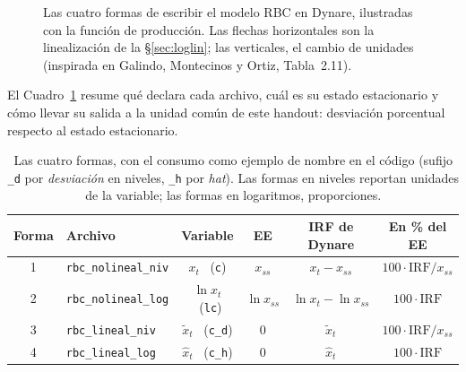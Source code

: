 \documentclass[11pt,a4paper]{report}
\newcommand{\code}[1]{\texttt{#1}}
\begin{document}
\begin{figure}[H]
\caption{Las cuatro formas de escribir el modelo RBC en Dynare, ilustradas con la
función de producción. Las flechas horizontales son la linealización de la
\S\ref{sec:loglin}; las verticales, el cambio de unidades (inspirada en Galindo,
Montecinos y Ortiz, Tabla~2.11).}
\label{fig:cuatroformas}
\end{figure}

\noindent El Cuadro~\ref{tab:cuatroformas} resume qué declara cada archivo, cuál es
su estado estacionario y cómo llevar su salida a la unidad común de este handout:
desviación porcentual respecto al estado estacionario.

\begin{table}[H]
\centering\small
\setlength{\tabcolsep}{4pt}
\begin{tabular}{clcccc}
\toprule
\textbf{Forma} & \textbf{Archivo} & \textbf{Variable} & \textbf{EE} & \textbf{IRF de Dynare} & \textbf{En \% del EE}\\
\midrule
1 & \code{rbc\_nolineal\_niv} & $x_t$ \ (\code{c})        & $x_{ss}$     & $x_t-x_{ss}$ & $100\cdot\mathrm{IRF}/x_{ss}$\\
2 & \code{rbc\_nolineal\_log} & $\ln x_t$ \ (\code{lc})   & $\ln x_{ss}$ & $\ln x_t-\ln x_{ss}$ & $100\cdot\mathrm{IRF}$\\
3 & \code{rbc\_lineal\_niv}   & $\tilde{x}_t$ \ (\code{c\_d}) & $0$      & $\tilde{x}_t$ & $100\cdot\mathrm{IRF}/x_{ss}$\\
4 & \code{rbc\_lineal\_log}   & $\hat{x}_t$ \ (\code{c\_h})   & $0$      & $\hat{x}_t$   & $100\cdot\mathrm{IRF}$\\
\bottomrule
\end{tabular}
\caption{Las cuatro formas, con el consumo como ejemplo de nombre en el código
(sufijo \code{\_d} por \emph{desviación} en niveles, \code{\_h} por \emph{hat}).
Las formas en niveles reportan unidades de la variable; las formas en logaritmos,
proporciones.}
\label{tab:cuatroformas}
\end{table}
\end{document}

